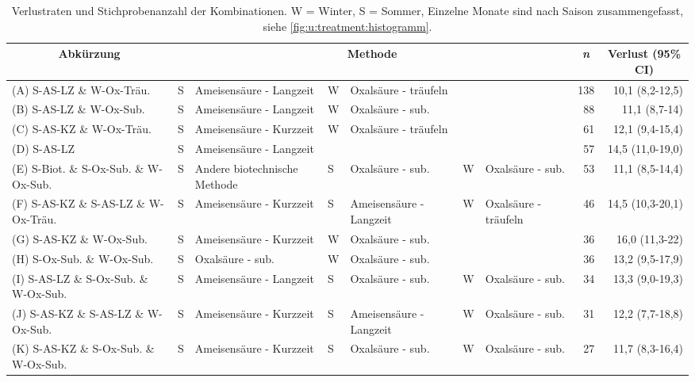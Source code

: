 \newpage
\begin{landscape}

\begin{table}[H]
  \centering
  \caption{Verlustraten und Stichprobenanzahl der Kombinationen. W = Winter, S = Sommer, Einzelne Monate sind nach Saison zusammengefasst, siehe \cref{fig:u:treatment:histogramm}.}
  \scriptsize
  \setlength{\tabcolsep}{0.5em} %
  \label{tab:u:kombinationen}
  \begin{tabular}{l|*{6}{l}|rr}
  \toprule
    \multicolumn{1}{c|}{Abkürzung} & 
    \multicolumn{6}{c|}{Methode} & 
    \multicolumn{1}{c}{\textit{n}} &
    \multicolumn{1}{c}{Verlust (95\% CI)}
    \\
    \midrule
    (A) S-AS-LZ \& W-Ox-Träu. & S & Ameisensäure - Langzeit & W & Oxalsäure - träufeln & & & 138 & 10,1 (8,2-12,5) \\
    (B) S-AS-LZ \& W-Ox-Sub.  & S & Ameisensäure - Langzeit & W & Oxalsäure - sub.     & & & 88  & 11,1 (8,7-14) \\
    (C) S-AS-KZ \& W-Ox-Träu. & S & Ameisensäure - Kurzzeit & W & Oxalsäure - träufeln & & & 61  & 12,1 (9,4-15,4) \\
    (D) S-AS-LZ               & S & Ameisensäure - Langzeit &        &                      & & & 57  & 14,5 (11,0-19,0) \\
    (E) S-Biot. \& S-Ox-Sub. \& W-Ox-Sub. & S & Andere biotechnische Methode & S & Oxalsäure - sub. & W & Oxalsäure - sub. & 53 & 11,1 (8,5-14,4) \\
    (F) S-AS-KZ \& S-AS-LZ \& W-Ox-Träu. & S & Ameisensäure - Kurzzeit      & S & Ameisensäure - Langzeit & W & Oxalsäure - träufeln & 46 & 14,5 (10,3-20,1) \\
    (G) S-AS-KZ \& W-Ox-Sub.                & S & Ameisensäure - Kurzzeit & W & Oxalsäure - sub.     & & & 36 & 16,0 (11,3-22) \\
    (H) S-Ox-Sub. \& W-Ox-Sub.              & S & Oxalsäure - sub.        & W & Oxalsäure - sub.     & & & 36 & 13,2 (9,5-17,9) \\
    (I) S-AS-LZ \& S-Ox-Sub. \& W-Ox-Sub.   & S & Ameisensäure - Langzeit & S & Oxalsäure - sub. & W & Oxalsäure - sub. & 34 & 13,3 (9,0-19,3) \\
    (J) S-AS-KZ \& S-AS-LZ \& W-Ox-Sub. & S & Ameisensäure - Kurzzeit & S & Ameisensäure - Langzeit & W & Oxalsäure - sub. & 31 & 12,2 (7,7-18,8) \\
    (K) S-AS-KZ \& S-Ox-Sub. \& W-Ox-Sub. & S & Ameisensäure - Kurzzeit & S & Oxalsäure - sub. & W & Oxalsäure - sub. & 27 & 11,7 (8,3-16,4) \\

\end{tabular}
\end{table}
\end{landscape}
